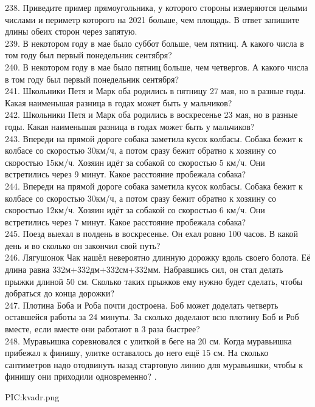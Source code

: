 238. Приведите пример прямоугольника, у которого стороны измеряются целыми числами и периметр которого на 2021 больше, чем площадь. В ответ запишите длины обеих сторон через запятую.\\
239. В некотором году в мае было суббот больше, чем пятниц. А какого числа в том году был первый понедельник сентября?\\
240. В некотором году в мае было пятниц больше, чем четвергов. А какого числа в том году был первый понедельник сентября?\\
241. Школьники Петя и Марк оба родились в пятницу 27 мая, но в разные годы. Какая наименьшая разница в годах может быть у мальчиков?\\
242. Школьники Петя и Марк оба родились в воскресенье 23 мая, но в разные годы. Какая наименьшая разница в годах может быть у мальчиков?\\
243. Впереди на прямой дороге собака заметила кусок колбасы. Собака бежит к колбасе со скоростью 30км/ч, а потом сразу бежит обратно к хозяину со скоростью 15км/ч. Хозяин идёт за собакой со скоростью 5 км/ч. Они встретились через 9 минут. Какое расстояние пробежала собака?\\
244. Впереди на прямой дороге собака заметила кусок колбасы. Собака бежит к колбасе со скоростью 30км/ч, а потом сразу бежит обратно к хозяину со скоростью 12км/ч. Хозяин идёт за собакой со скоростью 6 км/ч. Они встретились через 7 минут. Какое расстояние пробежала собака?\\
245. Поезд выехал в полдень в воскресенье. Он ехал ровно 100 часов. В какой день и во сколько он закончил свой путь?\\
246. Лягушонок Чак нашёл невероятно длинную дорожку вдоль своего болота. Её длина равна 332м$+$332дм$+$332см$+$332мм. Набравшись сил, он стал делать прыжки длиной 50 см. Сколько таких прыжков ему нужно будет сделать, чтобы добраться до конца дорожки?\\
247. Плотина Боба и Роба почти достроена. Боб может доделать четверть оставшейся работы за 24 минуты. За сколько доделают всю плотину Боб и Роб вместе, если вместе они работают в 3 раза быстрее?\\
248. Муравьишка соревновался с улиткой в беге на 20 см. Когда муравьишка прибежал к финишу, улитке оставалось до него ещё 15 см. На сколько сантиметров надо отодвинуть назад стартовую линию для муравьишки, чтобы к финишу они приходили одновременно?\newpage
{}. \begin{center}
{{PIC:kvadr.png}}
\end{center}
